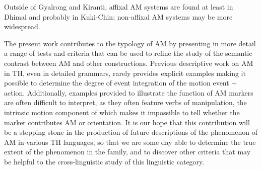 \documentclass[oneside,a4paper,11pt]{article}
\begin{document}
Outside of Gyalrong and Kiranti, affixal AM systems are found at least in Dhimal and probably in Kuki-Chin; non-affixal AM systems may be more widespread.


The present work contributes to the typology of AM by presenting in more detail a range of tests and criteria that can be used to refine the study of the semantic contrast between AM and other constructions. Previous descriptive work on AM in TH, even in detailed grammars, rarely provides explicit examples making it possible to determine the degree of event integration of the motion event + action.  Additionally, examples provided to illustrate the function of AM markers are often difficult to interpret, as they often feature verbs of manipulation, the intrinsic motion component of which makes it impossible to tell whether the marker contributes AM or orientation.  It is our hope that this contribution will be a stepping stone in the production of future descriptions of the phenomenon of AM in various TH languages, so that we are some day able to determine the true extent of the phenomenon in the family, and to discover other criteria that may be helpful to the cross-linguistic study of this linguistic category.
\end{document}
